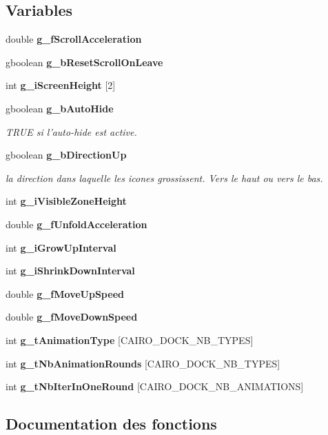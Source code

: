 \subsection*{Variables}
\begin{CompactItemize}
\item 
double {\bf g\_\-f\-Scroll\-Acceleration}
\item 
gboolean {\bf g\_\-b\-Reset\-Scroll\-On\-Leave}
\item 
int {\bf g\_\-i\-Screen\-Height} [2]
\item 
gboolean {\bf g\_\-b\-Auto\-Hide}
\begin{CompactList}\small\item\em TRUE si l'auto-hide est active. \item\end{CompactList}\item 
gboolean {\bf g\_\-b\-Direction\-Up}
\begin{CompactList}\small\item\em la direction dans laquelle les icones grossissent. Vers le haut ou vers le bas. \item\end{CompactList}\item 
int {\bf g\_\-i\-Visible\-Zone\-Height}
\item 
double {\bf g\_\-f\-Unfold\-Acceleration}
\item 
int {\bf g\_\-i\-Grow\-Up\-Interval}
\item 
int {\bf g\_\-i\-Shrink\-Down\-Interval}
\item 
double {\bf g\_\-f\-Move\-Up\-Speed}
\item 
double {\bf g\_\-f\-Move\-Down\-Speed}
\item 
int {\bf g\_\-t\-Animation\-Type} [CAIRO\_\-DOCK\_\-NB\_\-TYPES]
\item 
int {\bf g\_\-t\-Nb\-Animation\-Rounds} [CAIRO\_\-DOCK\_\-NB\_\-TYPES]
\item 
int {\bf g\_\-t\-Nb\-Iter\-In\-One\-Round} [CAIRO\_\-DOCK\_\-NB\_\-ANIMATIONS]
\end{CompactItemize}


\subsection{Documentation des fonctions}
